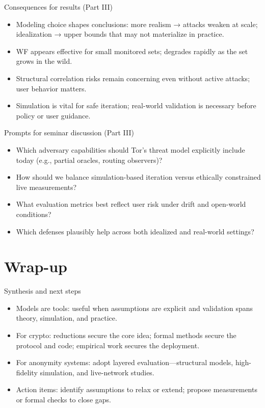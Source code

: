 \documentclass[11pt]{article}
\begin{document}
\begin{frame}{Consequences for results (Part III)}
  \begin{itemize}
    \item Modeling choice shapes conclusions: more realism → attacks weaken at scale; idealization → upper bounds that may not materialize in practice.
    \item WF appears effective for small monitored sets; degrades rapidly as the set grows in the wild.
    \item Structural correlation risks remain concerning even without active attacks; user behavior matters.
    \item Simulation is vital for safe iteration; real-world validation is necessary before policy or user guidance.
  \end{itemize}
\end{frame}

\begin{frame}{Prompts for seminar discussion (Part III)}
  \begin{itemize}
    \item Which adversary capabilities should Tor’s threat model explicitly include today (e.g., partial oracles, routing observers)?
    \item How should we balance simulation-based iteration versus ethically constrained live measurements?
    \item What evaluation metrics best reflect user risk under drift and open-world conditions?
    \item Which defenses plausibly help across both idealized and real-world settings?
  \end{itemize}
\end{frame}

\section{Wrap-up}

\begin{frame}{Synthesis and next steps}
  \begin{itemize}
    \item Models are tools: useful when assumptions are explicit and validation spans theory, simulation, and practice.
    \item For crypto: reductions secure the core idea; formal methods secure the protocol and code; empirical work secures the deployment.
    \item For anonymity systems: adopt layered evaluation—structural models, high-fidelity simulation, and live-network studies.
    \item Action items: identify assumptions to relax or extend; propose measurements or formal checks to close gaps.
  \end{itemize}
\end{frame}
\end{document}
